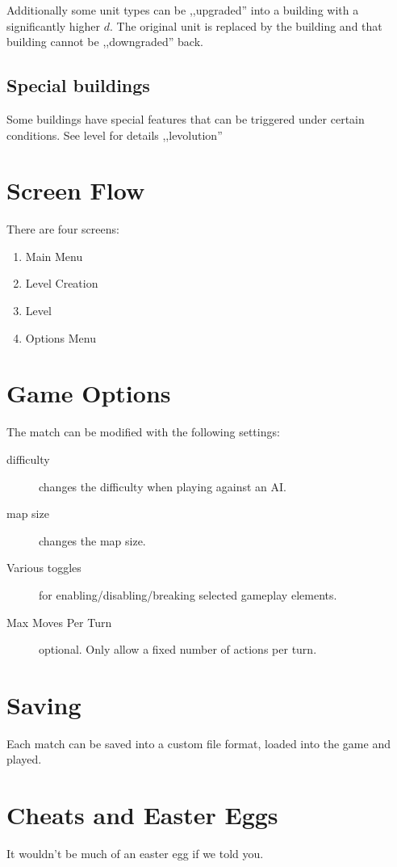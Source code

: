 Additionally some unit types can be ,,upgraded'' into a building with a significantly higher $d$. The original unit is replaced by the
building and that building cannot be ,,downgraded'' back.
\subsection{Special buildings} %
Some buildings have special features that can be triggered under certain conditions. See level for details
,,levolution''
\section{Screen Flow} %
There are four screens:

\begin{enumerate}
    \item Main Menu
    \item Level Creation
    \item Level
    \item Options Menu
\end{enumerate}
\section{Game Options} %
The match can be modified with the following settings:

\begin{description}
    \item[difficulty] changes the difficulty when playing against an AI.
    \item[map size] changes the map size.
    \item[Various toggles] for enabling/disabling/breaking selected gameplay elements.
    \item[Max Moves Per Turn] optional. Only allow a fixed number of actions per turn.
\end{description}
\section{Saving} %
Each match can be saved into a custom file format, loaded into the game and played.
\section{Cheats and Easter Eggs} %
It wouldn't be much of an easter egg if we told you.

